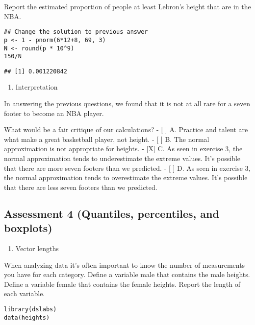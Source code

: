 \documentclass[]{article}
\providecommand{\tightlist}{%
  \setlength{\itemsep}{0pt}\setlength{\parskip}{0pt}}
\begin{document}
Report the estimated proportion of people at least Lebron's height that
are in the NBA.

\begin{verbatim}
## Change the solution to previous answer
p <- 1 - pnorm(6*12+8, 69, 3)
N <- round(p * 10^9)
150/N
\end{verbatim}

\begin{verbatim}
## [1] 0.001220842
\end{verbatim}

\begin{enumerate}
\def\labelenumi{\arabic{enumi}.}
\setcounter{enumi}{7}
\tightlist
\item
  Interpretation
\end{enumerate}

In answering the previous questions, we found that it is not at all rare
for a seven footer to become an NBA player.

What would be a fair critique of our calculations? - {[} {]} A. Practice
and talent are what make a great basketball player, not height. - {[}
{]} B. The normal approximation is not appropriate for heights. -
{[}X{]} C. As seen in exercise 3, the normal approximation tends to
underestimate the extreme values. It's possible that there are more
seven footers than we predicted. - {[} {]} D. As seen in exercise 3, the
normal approximation tends to overestimate the extreme values. It's
possible that there are less seven footers than we predicted.

\hypertarget{assessment-4-quantiles-percentiles-and-boxplots}{%
\subsection{Assessment 4 (Quantiles, percentiles, and
boxplots)}\label{assessment-4-quantiles-percentiles-and-boxplots}}

\begin{enumerate}
\def\labelenumi{\arabic{enumi}.}
\tightlist
\item
  Vector lengths
\end{enumerate}

When analyzing data it's often important to know the number of
measurements you have for each category. Define a variable male that
contains the male heights. Define a variable female that contains the
female heights. Report the length of each variable.

\begin{verbatim}
library(dslabs)
data(heights)
\end{verbatim}
\end{document}
